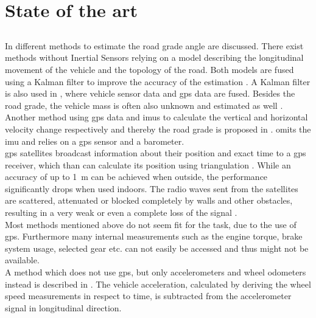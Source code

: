 \chapter{State of the art}
\label{ch:StateOfTheArt}

\section{}
In \cite{Jauch2018} different methods to estimate the road grade angle are discussed.
There exist methods without Inertial Sensors relying on a model describing the longitudinal movement of the vehicle and the topology of the road.
Both models are fused using a Kalman filter to improve the accuracy of the estimation \cite{SAHLHOLM200755}.
A Kalman filter is also used in \cite{Sahlholm2010}, where vehicle sensor data and \acrfull{gps} data are fused.
Besides the road grade, the vehicle mass is often also unknown and estimated as well \cite{Sahlholm2010,Maleej2015}.
Another method using \acrshort{gps} data and \acrshort{imu}s to calculate the vertical and horizontal velocity change respectively and thereby the road grade is proposed in \cite{Ryu2004}.
\cite{YazdaniBoroujeni2014} omits the \acrshort{imu} and relies on a \acrshort{gps} sensor and a barometer.\\
\acrshort{gps} satellites broadcast information about their position and exact time to a \acrshort{gps} receiver, which than can calculate its position using triangulation \cite{Koyuncu2010}.
While an accuracy of up to \SI{1}{\metre} can be achieved when outside, the performance significantly drops when used indoors.
The radio waves sent from the satellites are scattered, attenuated or blocked completely by walls and other obstacles, resulting in a very weak or even a complete loss of the signal \cite{Ozdenizci2015}.\\
Most methods mentioned above do not seem fit for the task, due to the use of \acrshort{gps}.
Furthermore many internal measurements such as the engine torque, brake system usage, selected gear etc. can not easily be accessed and thus might not be available.\\
A method which does not use \acrshort{gps}, but only accelerometers and wheel odometers instead is described in \cite{Nilsson2012}.
The vehicle acceleration, calculated by deriving the wheel speed measurements in respect to time, is subtracted from the accelerometer signal in longitudinal direction.
